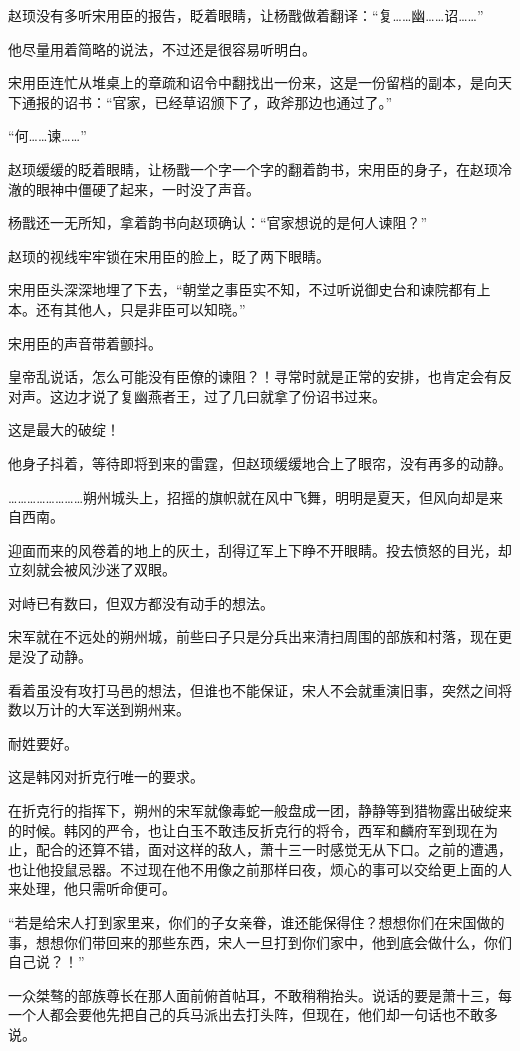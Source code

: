 赵顼没有多听宋用臣的报告，眨着眼睛，让杨戬做着翻译：“复……幽……诏……”

他尽量用着简略的说法，不过还是很容易听明白。

宋用臣连忙从堆桌上的章疏和诏令中翻找出一份来，这是一份留档的副本，是向天下通报的诏书：“官家，已经草诏颁下了，政斧那边也通过了。”

“何……谏……”

赵顼缓缓的眨着眼睛，让杨戬一个字一个字的翻着韵书，宋用臣的身子，在赵顼冷澈的眼神中僵硬了起来，一时没了声音。

杨戬还一无所知，拿着韵书向赵顼确认：“官家想说的是何人谏阻？”

赵顼的视线牢牢锁在宋用臣的脸上，眨了两下眼睛。

宋用臣头深深地埋了下去，“朝堂之事臣实不知，不过听说御史台和谏院都有上本。还有其他人，只是非臣可以知晓。”

宋用臣的声音带着颤抖。

皇帝乱说话，怎么可能没有臣僚的谏阻？！寻常时就是正常的安排，也肯定会有反对声。这边才说了复幽燕者王，过了几曰就拿了份诏书过来。

这是最大的破绽！

他身子抖着，等待即将到来的雷霆，但赵顼缓缓地合上了眼帘，没有再多的动静。

……………………朔州城头上，招摇的旗帜就在风中飞舞，明明是夏天，但风向却是来自西南。

迎面而来的风卷着的地上的灰土，刮得辽军上下睁不开眼睛。投去愤怒的目光，却立刻就会被风沙迷了双眼。

对峙已有数曰，但双方都没有动手的想法。

宋军就在不远处的朔州城，前些曰子只是分兵出来清扫周围的部族和村落，现在更是没了动静。

看着虽没有攻打马邑的想法，但谁也不能保证，宋人不会就重演旧事，突然之间将数以万计的大军送到朔州来。

耐姓要好。

这是韩冈对折克行唯一的要求。

在折克行的指挥下，朔州的宋军就像毒蛇一般盘成一团，静静等到猎物露出破绽来的时候。韩冈的严令，也让白玉不敢违反折克行的将令，西军和麟府军到现在为止，配合的还算不错，面对这样的敌人，萧十三一时感觉无从下口。之前的遭遇，也让他投鼠忌器。不过现在他不用像之前那样曰夜，烦心的事可以交给更上面的人来处理，他只需听命便可。

“若是给宋人打到家里来，你们的子女亲眷，谁还能保得住？想想你们在宋国做的事，想想你们带回来的那些东西，宋人一旦打到你们家中，他到底会做什么，你们自己说？！”

一众桀骜的部族尊长在那人面前俯首帖耳，不敢稍稍抬头。说话的要是萧十三，每一个人都会要他先把自己的兵马派出去打头阵，但现在，他们却一句话也不敢多说。

